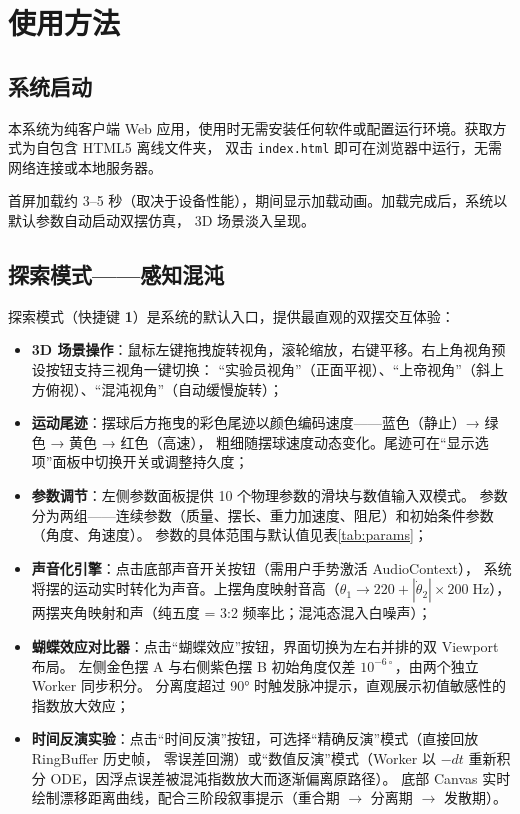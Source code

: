 \section{使用方法}

\subsection{系统启动}

本系统为纯客户端 Web 应用，使用时无需安装任何软件或配置运行环境。获取方式为自包含 HTML5 离线文件夹，
双击 \texttt{index.html} 即可在浏览器中运行，无需网络连接或本地服务器。

首屏加载约 3--5 秒（取决于设备性能），期间显示加载动画。加载完成后，系统以默认参数自动启动双摆仿真，
3D 场景淡入呈现。

\subsection{探索模式——感知混沌}

探索模式（快捷键 \textbf{1}）是系统的默认入口，提供最直观的双摆交互体验：

\begin{itemize}
  \item \textbf{3D 场景操作}：鼠标左键拖拽旋转视角，滚轮缩放，右键平移。右上角视角预设按钮支持三视角一键切换：
       “实验员视角”（正面平视）、“上帝视角”（斜上方俯视）、“混沌视角”（自动缓慢旋转）；
  \item \textbf{运动尾迹}：摆球后方拖曳的彩色尾迹以颜色编码速度——蓝色（静止）→ 绿色 → 黄色 → 红色（高速），
       粗细随摆球速度动态变化。尾迹可在“显示选项”面板中切换开关或调整持久度；
  \item \textbf{参数调节}：左侧参数面板提供 10 个物理参数的滑块与数值输入双模式。
       参数分为两组——连续参数（质量、摆长、重力加速度、阻尼）和初始条件参数（角度、角速度）。
       参数的具体范围与默认值见表\ref{tab:params}；
  \item \textbf{声音化引擎}：点击底部声音开关按钮（需用户手势激活 AudioContext），
       系统将摆的运动实时转化为声音。上摆角度映射音高（$\theta_1 \to 220 + |\dot{\theta}_2| \times 200\;\mathrm{Hz}$），
       两摆夹角映射和声（纯五度 = 3:2 频率比；混沌态混入白噪声）；
  \item \textbf{蝴蝶效应对比器}：点击“蝴蝶效应”按钮，界面切换为左右并排的双 Viewport 布局。
       左侧金色摆 A 与右侧紫色摆 B 初始角度仅差 $10^{-6\circ}$，由两个独立 Worker 同步积分。
       分离度超过 90° 时触发脉冲提示，直观展示初值敏感性的指数放大效应；
  \item \textbf{时间反演实验}：点击“时间反演”按钮，可选择“精确反演”模式（直接回放 RingBuffer 历史帧，
       零误差回溯）或“数值反演”模式（Worker 以 $-dt$ 重新积分 ODE，因浮点误差被混沌指数放大而逐渐偏离原路径）。
       底部 Canvas 实时绘制漂移距离曲线，配合三阶段叙事提示（重合期 $\to$ 分离期 $\to$ 发散期）。
\end{itemize}

